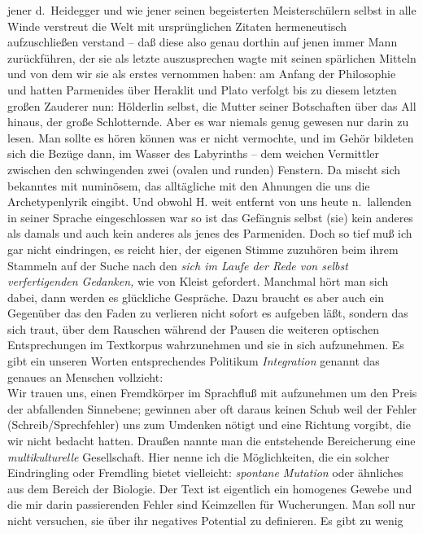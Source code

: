 \documentclass[
]{article}
\begin{document}
\begin{enumerate}
  jener d.~Heidegger und wie jener seinen begeisterten Meisterschülern
  selbst in alle Winde verstreut die Welt mit ursprünglichen Zitaten
  hermeneutisch aufzuschließen verstand -- daß diese also genau dorthin
  auf jenen immer Mann zurückführen, der sie als letzte auszusprechen
  wagte mit seinen spärlichen Mitteln und von dem wir sie als erstes
  vernommen haben: am Anfang der Philosophie und hatten Parmenides über
  Heraklit und Plato verfolgt bis zu diesem letzten großen Zauderer nun:
  Hölderlin selbst, die Mutter seiner Botschaften über das All hinaus,
  der große Schlotternde. Aber es war niemals genug gewesen nur darin zu
  lesen. Man sollte es hören können was er nicht vermochte, und im Gehör
  bildeten sich die Bezüge dann, im Wasser des Labyrinths -- dem weichen
  Vermittler zwischen den schwingenden zwei (ovalen und runden)
  Fenstern. Da mischt sich bekanntes mit numinösem, das alltägliche mit
  den Ahnungen die uns die Archetypenlyrik eingibt. Und obwohl H. weit
  entfernt von uns heute n.~lallenden in seiner Sprache eingeschlossen
  war so ist das Gefängnis selbst (sie) kein anderes als damals und auch
  kein anderes als jenes des Parmeniden. Doch so tief muß ich gar nicht
  eindringen, es reicht hier, der eigenen Stimme zuzuhören beim ihrem
  Stammeln auf der Suche nach den \emph{sich im Laufe der Rede von
  selbst verfertigenden Gedanken, }wie von Kleist gefordert. Manchmal
  hört man sich dabei, dann werden es glückliche Gespräche. Dazu braucht
  es aber auch ein Gegenüber das den Faden zu verlieren nicht sofort es
  aufgeben läßt, sondern das sich traut, über dem Rauschen während der
  Pausen die weiteren optischen Entsprechungen im Textkorpus
  wahrzunehmen und sie in sich aufzunehmen. Es gibt ein unseren Worten
  entsprechendes Politikum \emph{Integration} genannt das genaues an
  Menschen vollzieht:\\
  Wir trauen uns, einen Fremdkörper im Sprachfluß mit aufzunehmen um den
  Preis der abfallenden Sinnebene; gewinnen aber oft daraus keinen Schub
  weil der Fehler (Schreib/Sprechfehler) uns zum Umdenken nötigt und
  eine Richtung vorgibt, die wir nicht bedacht hatten. Draußen nannte
  man die entstehende Bereicherung eine \emph{multikulturelle
  }Gesellschaft. Hier nenne ich die Möglichkeiten, die ein solcher
  Eindringling oder Fremdling bietet vielleicht: \emph{spontane
  Mutation} oder ähnliches aus dem Bereich der Biologie. Der Text ist
  eigentlich ein homogenes Gewebe und die mir darin passierenden Fehler
  sind Keimzellen für Wucherungen. Man soll nur nicht versuchen, sie
  über ihr negatives Potential zu definieren. Es gibt zu wenig

\end{enumerate}
\end{document}
